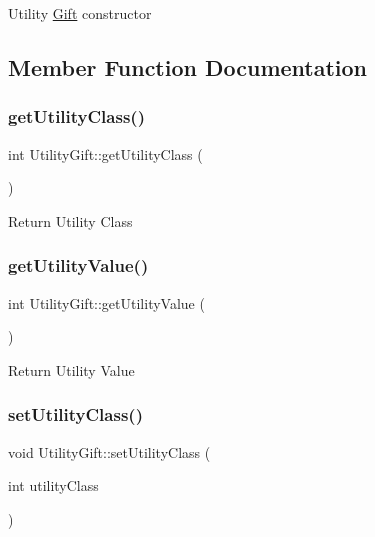 Utility \hyperlink{class_gift}{Gift} constructor 

\subsection{Member Function Documentation}
\mbox{\label{class_utility_gift_a6a7f37fde70bb92718d6c0b751a092c5}} 
\subsubsection{\texorpdfstring{get\+Utility\+Class()}{getUtilityClass()}}
{\footnotesize\ttfamily int Utility\+Gift\+::get\+Utility\+Class (\begin{DoxyParamCaption}{ }\end{DoxyParamCaption})}

Return Utility Class \mbox{\label{class_utility_gift_ad40c77a46869bdedc03de940ff64e42e}} 
\subsubsection{\texorpdfstring{get\+Utility\+Value()}{getUtilityValue()}}
{\footnotesize\ttfamily int Utility\+Gift\+::get\+Utility\+Value (\begin{DoxyParamCaption}{ }\end{DoxyParamCaption})}

Return Utility Value \mbox{\label{class_utility_gift_acad2ce4adfa16775a6676fb140468fb4}} 
\subsubsection{\texorpdfstring{set\+Utility\+Class()}{setUtilityClass()}}
{\footnotesize\ttfamily void Utility\+Gift\+::set\+Utility\+Class (\begin{DoxyParamCaption}\item[{int}]{utility\+Class }\end{DoxyParamCaption})}

